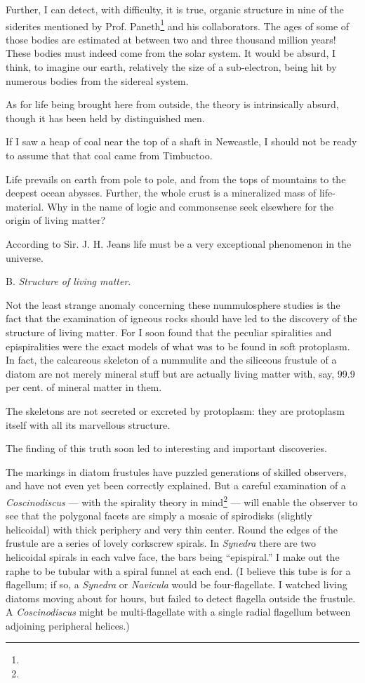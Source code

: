 \documentclass[a4paper, 12pt, oneside]{article}
\begin{document}
Further, I can detect, with difficulty, it is true, organic structure in nine of the siderites mentioned by Prof. Paneth\footnote{} and his collaborators. The ages of some of those bodies are estimated at between two and three thousand million years! These bodies must indeed come from the solar system. It would be absurd, I think, to imagine our earth, relatively the size of a sub-electron, being hit by numerous bodies from the sidereal system.

As for life being brought here from outside, the theory is intrinsically absurd, though it has been held by distinguished men.

If I saw a heap of coal near the top of a shaft in Newcastle, I should not be ready to assume that that coal came from Timbuctoo.

Life prevails on earth from pole to pole, and from the tops of mountains to the deepest ocean abysses. Further, the whole crust is a mineralized mass of life-material. Why in the name of logic and commonsense seek elsewhere for the origin of living matter?

According to Sir. J. H. Jeans life must be a very exceptional phenomenon in the universe.

\centerline{B. \emph{Structure of living matter}.}

Not the least strange anomaly concerning these nummulosphere studies is the fact that the examination of igneous rocks should have led to the discovery of the structure of living matter. For I soon found that the peculiar spiralities and epispiralities were the exact models of what was to be found in soft protoplasm. In fact, the calcareous skeleton of a nummulite and the siliceous frustule of a diatom are not merely mineral stuff but are actually living matter with, say, 99.9 per cent. of mineral matter in them.

The skeletons are not secreted or excreted by protoplasm: they are protoplasm itself with all its marvellous structure.

The finding of this truth soon led to interesting and important discoveries.

The markings in diatom frustules have puzzled generations of skilled observers, and have not even yet been correctly explained. But a careful examination of a \emph{Coscinodiscus} --- with the spirality theory in mind\footnote{} --- will enable the observer to see that the polygonal facets are simply a mosaic of spirodisks (slightly helicoidal) with thick periphery and very thin center. Round the edges of the frustule are a series of lovely corkscrew spirals. In \emph{Synedra} there are two helicoidal spirals in each valve face, the bars being ``epispiral.'' I make out the raphe to be tubular with a spiral funnel at each end. (I believe this tube is for a flagellum; if so, a \emph{Synedra} or \emph{Navicula} would be four-flagellate. I watched living diatoms moving about for hours, but failed to detect flagella outside the frustule. A \emph{Coscinodiscus} might be multi-flagellate with a single radial flagellum between adjoining peripheral helices.)
\end{document}
